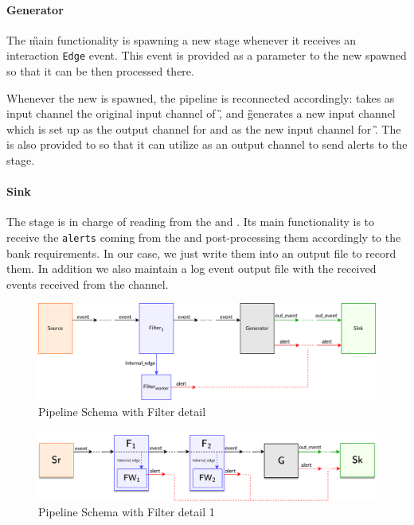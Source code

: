 \paragraph*{Generator\\}

The \generator \G main functionality is spawning a new \filter \F stage whenever it receives an interaction \texttt{Edge} event. This event is provided as a parameter to the new spawned \F so that it can be then processed there.

Whenever the new \F is spawned, the pipeline is reconnected accordingly: \F takes as \eventch input channel the original \eventch input channel of \G, and \G generates a new \eventch input channel which is set up as the output \eventch channel for \F and as the new input \eventch channel for \G. The \alertch is also provided to \F so that it can utilize as an output channel to send alerts to the \sink stage.


\paragraph*{Sink\\}

The \sink \Sk stage is in charge of reading from the \eventch and \alertch. Its main functionality is to receive the \texttt{alerts} coming from the \alertch and post-processing them accordingly to the bank requirements. In our case, we just write them into an output file to record them. In addition we also maintain a log event output file with the received events received from the \eventch channel.

\begin{figure}[H]
  \centering
  \includegraphics[scale = 0.7]{images/3-Engine/pipeline-schema-filter-detail-old.png}
  \caption{Pipeline Schema with Filter detail}
  \label{img:pipeline-schema-0}
\end{figure}

\begin{figure}[H]
  \centering
  \includegraphics[scale = 0.7]{images/3-Engine/pipeline-schema-filter-detail-1.png}
  \caption{Pipeline Schema with Filter detail 1}
  \label{img:pipeline-schema-1}
\end{figure}
